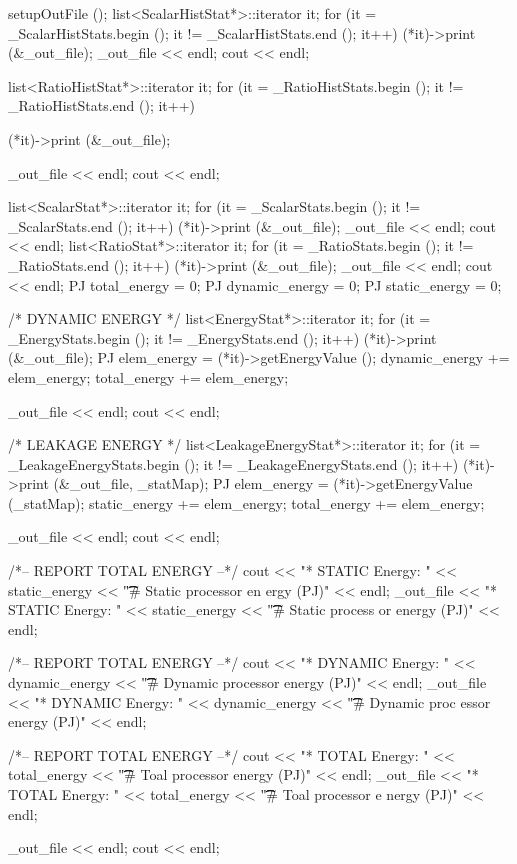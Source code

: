 \begin{DoxyCode}
                      {
    setupOutFile ();
    {
        list<ScalarHistStat*>::iterator it;
        for (it = _ScalarHistStats.begin (); it != _ScalarHistStats.end (); it++)
       {
            (*it)->print (&_out_file);
        }
        _out_file << endl;
        cout << endl;
    }
    {
        list<RatioHistStat*>::iterator it;
        for (it = _RatioHistStats.begin (); it != _RatioHistStats.end (); it++) {
      
            (*it)->print (&_out_file);
        }
        _out_file << endl;
        cout << endl;
    }
    {
        list<ScalarStat*>::iterator it;
        for (it = _ScalarStats.begin (); it != _ScalarStats.end (); it++) {
            (*it)->print (&_out_file);
        }
        _out_file << endl;
        cout << endl;
    }
    {
        list<RatioStat*>::iterator it;
        for (it = _RatioStats.begin (); it != _RatioStats.end (); it++) {
            (*it)->print (&_out_file);
        }
        _out_file << endl;
        cout << endl;
    }
    PJ total_energy = 0;
    PJ dynamic_energy = 0;
    PJ static_energy = 0;
    { /* DYNAMIC ENERGY */
        list<EnergyStat*>::iterator it;
        for (it = _EnergyStats.begin (); it != _EnergyStats.end (); it++) {
            (*it)->print (&_out_file);
            PJ elem_energy = (*it)->getEnergyValue ();
            dynamic_energy += elem_energy;
            total_energy += elem_energy;
        }

        _out_file << endl;
        cout << endl;
    }
    { /* LEAKAGE ENERGY */
        list<LeakageEnergyStat*>::iterator it;
        for (it = _LeakageEnergyStats.begin (); it != _LeakageEnergyStats.end ();
       it++) {
            (*it)->print (&_out_file, _statMap);
            PJ elem_energy = (*it)->getEnergyValue (_statMap);
            static_energy += elem_energy;
            total_energy += elem_energy;
        }

        _out_file << endl;
        cout << endl;
    }

    /*-- REPORT TOTAL ENERGY --*/
    cout << "* STATIC Energy: " << static_energy << "\t\t\t # Static processor en
      ergy (PJ)" << endl;
    _out_file << "* STATIC Energy: " << static_energy << "\t\t\t # Static process
      or energy (PJ)" << endl;

    /*-- REPORT TOTAL ENERGY --*/
    cout << "* DYNAMIC Energy: " << dynamic_energy << "\t\t\t # Dynamic processor
       energy (PJ)" << endl;
    _out_file << "* DYNAMIC Energy: " << dynamic_energy << "\t\t\t # Dynamic proc
      essor energy (PJ)" << endl;

    /*-- REPORT TOTAL ENERGY --*/
    cout << "* TOTAL Energy: " << total_energy << "\t\t\t # Toal processor energy
       (PJ)" << endl;
    _out_file << "* TOTAL Energy: " << total_energy << "\t\t\t # Toal processor e
      nergy (PJ)" << endl;

    _out_file << endl;
    cout << endl;
}
\end{DoxyCode}


